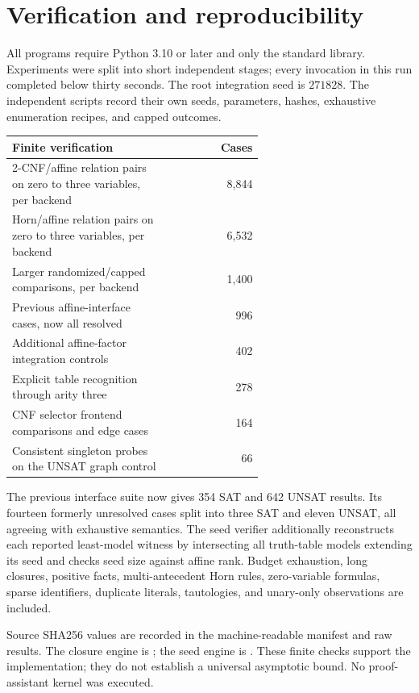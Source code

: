\documentclass[11pt]{article}
\begin{document}
\section{Verification and reproducibility}
All programs require Python 3.10 or later and only the standard library.
Experiments were split into short independent stages; every invocation
in this run completed below thirty seconds.
The root integration seed is \(271828\).
The independent scripts record their own seeds, parameters, hashes,
exhaustive enumeration recipes, and capped outcomes.

\begin{center}
\begin{tabular}{p{0.62\linewidth}r}
\toprule
Finite verification & Cases\\
\midrule
2-CNF/affine relation pairs on zero to three variables, per backend & 8,844\\
Horn/affine relation pairs on zero to three variables, per backend & 6,532\\
Larger randomized/capped comparisons, per backend & 1,400\\
Previous affine-interface cases, now all resolved & 996\\
Additional affine-factor integration controls & 402\\
Explicit table recognition through arity three & 278\\
CNF selector frontend comparisons and edge cases & 164\\
Consistent singleton probes on the UNSAT graph control & 66\\
\bottomrule
\end{tabular}
\end{center}

The previous interface suite now gives 354 SAT and 642 UNSAT results.
Its fourteen formerly unresolved cases split into three SAT and eleven
UNSAT, all agreeing with exhaustive semantics.
The seed verifier additionally reconstructs each reported least-model
witness by intersecting all truth-table models extending its seed and
checks seed size against affine rank.
Budget exhaustion, long closures, positive facts, multi-antecedent Horn
rules, zero-variable formulas, sparse identifiers, duplicate literals,
tautologies, and unary-only observations are included.

Source SHA256 values are recorded in the machine-readable manifest and
raw results. The closure engine is
;
the seed engine is
.
These finite checks support the implementation; they do not establish
a universal asymptotic bound. No proof-assistant kernel was executed.
\end{document}
